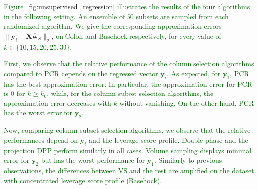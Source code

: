 \documentclass[twoside,11pt]{book}
\newcommand{\rev}[1]{\textcolor{darkgreen}{#1}}
\numberwithin{theorem}{chapter}
\numberwithin{definition}{chapter}
\numberwithin{proposition}{chapter}
\numberwithin{corollary}{chapter}
\numberwithin{example}{chapter}
\numberwithin{lemma}{chapter}
\DeclareMathOperator{\Span}{\mathrm{Span}}
\begin{document}


\rev{Figure}~\ref{fig:unsupervised_regression} \rev{illustrates the results of the four algorithms in the following setting. An ensemble of 50 subsets are sampled from each randomized algorithm. We give the corresponding approximation errors} $\|\mathbf{y}_{i} - \bm{X}\hat{\bm{w}}_S\|_{2}$, \rev{on Colon and Basehock respectively, for every value of $k \in \{10,15,20,25,30\}$}.

\rev{First, we observe that the relative performance of the column selection algorithms compared to PCR depends on the regressed vector $\mathbf{y}_{i}$. As expected, for $\mathbf{y}_{1}$, PCR has the best approximation error. In particular, the approximation error for PCR is $0$ for $k \geq k_{0}$, while, for the column subset selection algorithms, the approximation error decreases with $k$ without vanishing. On the other hand, PCR has the worst error for $\mathbf{y}_{2}$.
}

\rev{
Now, comparing column subset selection algorithms, we observe that the relative performances depend on $\mathbf{y}_{i}$ and the leverage score profile. Double phase and the projection DPP perform similarly in all cases. \rev{Volume sampling displays minimal error for $\mathbf{y}_{2}$ but has the worst performance for $\mathbf{y}_{1}$. Similarly to previous observations, } the differences between VS and the rest are amplified on the dataset with concentrated leverage score profile (Basehock).
}
\end{document}
